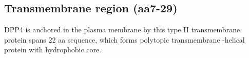 \subsection{Transmembrane region (aa7-29)}

DPP4 is anchored in the plasma membrane by this type II transmembrane protein spans 22 aa sequence, which forms polytopic transmembrane \alpha-helical protein with hydrophobic core.~\cite{Hong_1990}